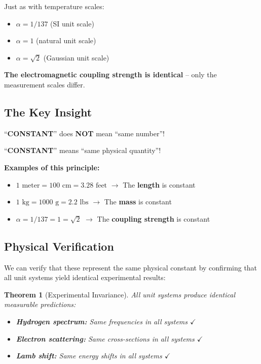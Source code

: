\documentclass[12pt,a4paper]{article}
\newtheorem{theorem}{Theorem}[section]
\begin{document}
Just as with temperature scales:
\begin{itemize}
	\item $\alpha = 1/137$ (SI unit scale)
	\item $\alpha = 1$ (natural unit scale)
	\item $\alpha = \sqrt{2}$ (Gaussian unit scale)
\end{itemize}

\textbf{The electromagnetic coupling strength is identical} -- only the measurement scales differ.

\subsection{The Key Insight}

\begin{tcolorbox}[colback=yellow!5!white,colframe=orange!75!black,title=Fundamental Principle]
	``\textbf{CONSTANT}'' does \textbf{NOT} mean ``same number''!
	
	``\textbf{CONSTANT}'' means ``same physical quantity''!
\end{tcolorbox}

\textbf{Examples of this principle:}
\begin{itemize}
	\item $1\text{ meter} = 100\text{ cm} = 3.28\text{ feet}$ $\rightarrow$ The \textbf{length} is constant
	\item $1\text{ kg} = 1000\text{ g} = 2.2\text{ lbs}$ $\rightarrow$ The \textbf{mass} is constant
	\item $\alpha = 1/137 = 1 = \sqrt{2}$ $\rightarrow$ The \textbf{coupling strength} is constant
\end{itemize}

\subsection{Physical Verification}

We can verify that these represent the same physical constant by confirming that all unit systems yield identical experimental results:

\begin{theorem}[Experimental Invariance]
	All unit systems produce identical measurable predictions:
	\begin{itemize}
		\item \textbf{Hydrogen spectrum:} Same frequencies in all systems $\checkmark$
		\item \textbf{Electron scattering:} Same cross-sections in all systems $\checkmark$
		\item \textbf{Lamb shift:} Same energy shifts in all systems $\checkmark$
	\end{itemize}
\end{theorem}
\end{document}
